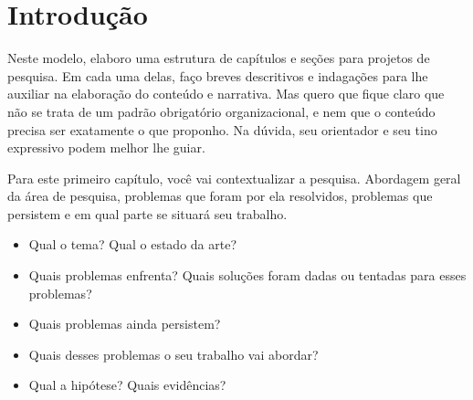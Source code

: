 
\chapter{Introdução}

Neste modelo, elaboro uma estrutura de capítulos e seções para projetos de pesquisa. Em cada uma delas, faço breves descritivos e indagações para lhe auxiliar na elaboração do conteúdo e narrativa. Mas quero que fique claro que não se trata de um padrão obrigatório organizacional, e nem que o conteúdo precisa ser exatamente o que proponho. Na dúvida, seu orientador e seu tino expressivo podem melhor lhe guiar.

Para este primeiro capítulo, você vai contextualizar a pesquisa. Abordagem geral da área de pesquisa, problemas que foram por ela resolvidos, problemas que persistem e em qual parte se situará seu trabalho.
\begin{itemize}
\item Qual o tema? Qual o estado da arte?
\item Quais problemas enfrenta? Quais soluções foram dadas ou tentadas para esses problemas?
\item Quais problemas ainda persistem?
\item Quais desses problemas o seu trabalho vai abordar?
\item Qual a hipótese? Quais evidências?
\end{itemize}